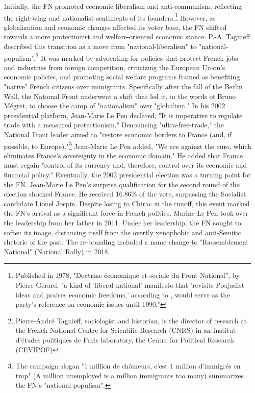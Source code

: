 Initially, the FN promoted economic liberalism and anti-communism, reflecting the right-wing and nationalist sentiments of its founders.\footnote{Published in 1978, "Doctrine économique et sociale du Front National", by Pierre Gérard, "a kind of 'liberal-national' manifesto that 'revisits Poujadist ideas and praises economic freedoms,' according to \cite{igounet2014}, would serve as the party's reference on economic issues until 1990."} However, as globalization and economic changes affected its voter base, the FN shifted towards a more protectionist and welfare-oriented economic stance. P.-A. Taguieff described this transition as a move from "national-liberalism" to "national-populism".\footnote{Pierre-André Taguieff, sociologist and historian, is the director of research at the French National Centre for Scientific Research (CNRS) in an Institut d'études politiques de Paris laboratory, the Centre for Political Research (CEVIPOF)} It was marked by advocating for policies that protect French jobs and industries from foreign competition, criticizing the European Union's economic policies, and promoting social welfare programs framed as benefiting "native" French citizens over immigrants. Specifically after the fall of the Berlin Wall, the National Front underwent a shift that led it, in the words of Bruno Mégret, to choose the camp of "nationalism" over "globalism." In his 2002 presidential platform, Jean-Marie Le Pen declared, "It is imperative to regulate trade with a measured protectionism." Denouncing "ultra-free-trade," the National Front leader aimed to "restore economic borders to France (and, if possible, to Europe)."\footnote{The campaign slogan "1  million de chômeurs, c'est 1 million d'immigrés en trop" (A million unemployed is a million immigrants too many) summarizes the FN's "national populism".} Jean-Marie Le Pen added, "We are against the euro, which eliminates France's sovereignty in the economic domain." He added that France must regain "control of its currency and, therefore, control over its economic and financial policy." Eventually, the 2002 presidential election was a turning point for the FN. Jean-Marie Le Pen's surprise qualification for the second round of the election shocked France. He received 16.86\% of the vote, surpassing the Socialist candidate Lionel Jospin. Despite losing to Chirac in the runoff, this event marked the FN's arrival as a significant force in French politics. Marine Le Pen took over the leadership from her father in 2011. Under her leadership, the FN sought to soften its image, distancing itself from the overtly xenophobic and anti-Semitic rhetoric of the past. The re-branding included a name change to "Rassemblement National" (National Rally) in 2018.

